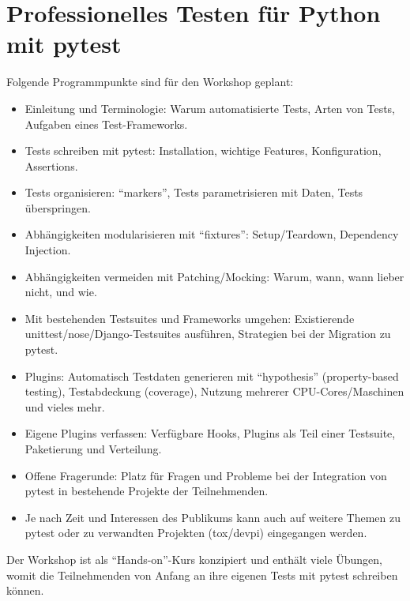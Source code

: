 \documentclass{scrartcl}
\begin{document}
\thispagestyle{empty}
\section*{Professionelles Testen für Python mit pytest}

Folgende Programmpunkte sind für den Workshop geplant:

\begin{itemize}
\item Einleitung und Terminologie: Warum automatisierte Tests, Arten von Tests, Aufgaben eines Test-Frameworks.
\item Tests schreiben mit pytest: Installation, wichtige Features, Konfiguration, Assertions.
\item Tests organisieren: \enquote{markers}, Tests parametrisieren mit Daten, Tests überspringen.
\item Abhängigkeiten modularisieren mit \enquote{fixtures}: Setup/Teardown, Dependency Injection.
\item Abhängigkeiten vermeiden mit Patching/Mocking: Warum, wann, wann lieber nicht, und wie.
\item Mit bestehenden Testsuites und Frameworks umgehen: Existierende unittest/nose/Django-Testsuites ausführen, Strategien bei der Migration zu pytest.
\item Plugins: Automatisch Testdaten generieren mit \enquote{hypothesis} (property-based testing), Testabdeckung (coverage), Nutzung mehrerer CPU-Cores/Maschinen und vieles mehr.
\item Eigene Plugins verfassen: Verfügbare Hooks, Plugins als Teil einer Testsuite, Paketierung und Verteilung.
\item Offene Fragerunde: Platz für Fragen und Probleme bei der Integration von pytest in bestehende Projekte der Teilnehmenden.
\item Je nach Zeit und Interessen des Publikums kann auch auf weitere Themen zu pytest oder zu verwandten Projekten (tox/devpi) eingegangen werden.
\end{itemize}

Der Workshop ist als \enquote{Hands-on}-Kurs konzipiert und enthält viele Übungen, womit die Teilnehmenden von Anfang an ihre eigenen Tests mit pytest schreiben können.
\end{document}
